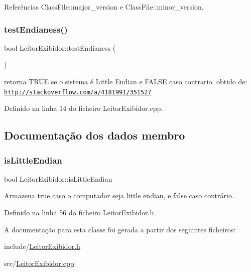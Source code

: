 Referências Class\+File\+::major\+\_\+version e Class\+File\+::minor\+\_\+version.

\mbox{\label{classLeitorExibidor_ac8ff6248b6897d88bb5cf22ea987a6ab}} 
\subsubsection{\texorpdfstring{test\+Endianess()}{testEndianess()}}
{\footnotesize\ttfamily bool Leitor\+Exibidor\+::test\+Endianess (\begin{DoxyParamCaption}{ }\end{DoxyParamCaption})\hspace{0.3cm}{\ttfamily [private]}}

retorna T\+R\+UE se o sistema é Little Endian e F\+A\+L\+SE caso contrario. obtido de\+: \href{http://stackoverflow.com/a/4181991/351527}{\tt http\+://stackoverflow.\+com/a/4181991/351527} 

Definido na linha 14 do ficheiro Leitor\+Exibidor.\+cpp.



\subsection{Documentação dos dados membro}
\mbox{\label{classLeitorExibidor_a25a267e1238c481356a970b17d2fd044}} 
\subsubsection{\texorpdfstring{is\+Little\+Endian}{isLittleEndian}}
{\footnotesize\ttfamily bool Leitor\+Exibidor\+::is\+Little\+Endian\hspace{0.3cm}{\ttfamily [private]}}



Armazena {\ttfamily true} caso o computador seja little endian, e {\ttfamily false} caso contrário. 



Definido na linha 56 do ficheiro Leitor\+Exibidor.\+h.



A documentação para esta classe foi gerada a partir dos seguintes ficheiros\+:\begin{DoxyCompactItemize}
\item 
include/\hyperlink{LeitorExibidor_8h}{Leitor\+Exibidor.\+h}\item 
src/\hyperlink{LeitorExibidor_8cpp}{Leitor\+Exibidor.\+cpp}\end{DoxyCompactItemize}
